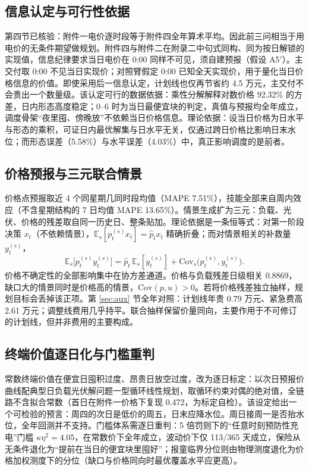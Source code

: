 \documentclass[12pt,a4paper]{ctexart}
\begin{document}
\subsection{信息认定与可行性依据}

第四节已核验：附件一电价逐时段等于附件四全年算术平均。因此前三问相当于用电价的无条件期望做规划。附件四与附件二在附录二中句式同构、同为按日解锁的实现值，信息纪律要求当日电价在 0:00 同样不可见，须自建预报（假设 A5$'$）。主交付取 0:00 不见当日实现价；对照臂假定 0:00 已知全天实现价，用于量化当日价格信息的价值。即使采用后一信息认定，计划线也仅再节省约 4.5 万元，主交付不会贵出一个数量级。该认定可行的数据依据：乘性分解解释对数价格 92.32\% 的方差，日内形态高度稳定；0--6 时为当日最便宜块的判定，真值与预报均全年成立，调度骨架“夜里囤、傍晚放”不依赖当日价格信息。理论依据：设当日价格为日水平与形态的乘积，可证日内最优解集与日水平无关，仅通过跨日价格比影响日末水位；而形态误差（5.58\%）与水平误差（4.03\%）中，真正影响调度的是前者。

\subsection{价格预报与三元联合情景}

价格点预报取近 4 个同星期几同时段均值（MAPE 7.51\%），技能全部来自周内效应（不含星期结构的 7 日均值 MAPE 13.65\%）。情景生成扩为三元：负载、光伏、价格的残差取自同一历史日、整条贴加。理论依据是一条恒等式：对第一阶段决策 $x_t$（不依赖情景），$\mathbb{E}_s[p_t^{(s)}x_t]=\hat p_t x_t$ 精确折叠；而对情景相关的补救量 $y_t^{(s)}$，
\begin{equation}
\mathbb{E}_s\bigl[p_t^{(s)}y_t^{(s)}\bigr]=\hat p_t\,\mathbb{E}_s[y_t^{(s)}]+\mathrm{Cov}_s\bigl(p_t^{(s)},y_t^{(s)}\bigr).
\label{eq:cov}
\end{equation}
价格不确定性的全部影响集中在协方差通道。价格与负载残差日级相关 0.8869，缺口大的情景同时是价格高的情景，$\mathrm{Cov}(p,u)>0$。若将价格残差独立抽样，规划目标会丢掉该正项。第 \ref{sec:aux} 节全年对照：计划线年贵 0.79 万元、紧急费高 2.61 万元；调整线费用几乎持平。联合抽样保留价量同向，主要作用于不可修订的计划线，但并非费用的主要构成。

\subsection{终端价值逐日化与门槛重判}

常数终端价值在便宜日囤积过度、昂贵日放空过度，改为逐日标定：以次日预报价曲线配典型日负载光伏解问题一型循环线性规划，取循环约束对偶的绝对值，全链路不含拟合常数（首日在附件一价格下复现 0.472，为标定自检）。该设定给出一个可检验的预言：周四的次日是低价的周五，日末应降水位。周日接周一是否抬水位，全年回测并不支持。门槛体系需逐日重判：5 倍罚则下的“任意时刻预防性充电”门槛 $\kappa\eta^2=4.05$，在常数价下全年成立，波动价下仅 113/365 天成立，保险从无条件退化为“提前在当日的便宜块里囤好”；报童临界分位则由物理测度退化为价格加权测度下的分位（缺口与价格同向时最优覆盖水平应更高）。
\end{document}
